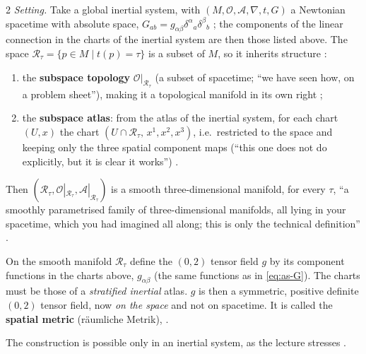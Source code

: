 \begin{paracol}{2}
\emph{Setting.} Take a global inertial system, with $(M,\mathcal O,\mathcal A,\nabla,t,G)$ a Newtonian spacetime with absolute space, $G_{ab}=g_{\alpha\beta}\delta^\alpha{}_a\delta^\beta{}_b$ ; the components of the linear connection in the charts of the inertial system are then those listed
above. The space $\mathcal R_\tau=\{p\in M\mid t(p)=\tau\}$ is a subset of $M$, so it inherits structure :
\begin{enumerate}
  \item the \textbf{subspace topology} $\mathcal O|_{\mathcal R_\tau}$ (a subset of spacetime; ``we have seen how, on a problem sheet''), making it a topological manifold in its own right ;
  \item the \textbf{subspace atlas}: from the atlas of the inertial system, for each chart $(U,x)$ the chart $(U\cap\mathcal R_\tau,\,x^1,x^2,x^3)$, i.e.\ restricted to the space and keeping only the three spatial component maps (``this one does not do explicitly, but it is clear it works'')
        .
\end{enumerate}
Then $(\mathcal R_\tau,\mathcal O|_{\mathcal R_\tau},\mathcal A|_{\mathcal R_\tau})$ is a smooth three-dimensional manifold, for every $\tau$, ``a smoothly parametrised family of three-dimensional manifolds, all lying in your spacetime, which you had imagined all along; this is only the technical definition''
.

\begin{definition}\label{def:as-g}
On the smooth manifold $\mathcal R_\tau$ define the $(0,2)$ tensor field $g$ by its component functions in the charts above,
$g_{\alpha\beta}$ (the same functions as in \eqref{eq:as-G}). The charts must be those of a \emph{stratified inertial} atlas. $g$ is then a symmetric, positive definite $(0,2)$ tensor field, now \emph{on the space} and not on spacetime. It is called the \textbf{spatial metric}
(r\"aumliche Metrik), .
\end{definition}
The construction is possible only in an inertial system, as the lecture stresses .


\end{paracol}
